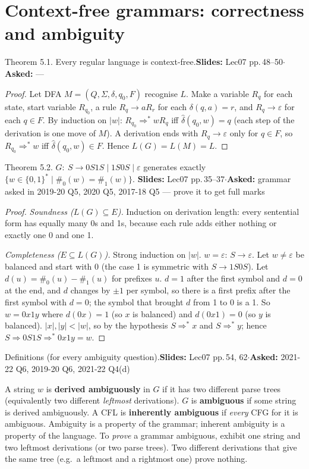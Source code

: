 \documentclass[10.5pt,a4paper]{article}
\newcommand{\src}[2]{{\footnotesize\color{gray!70!black}\textbf{Slides:} #1\enspace$\cdot$\enspace\textbf{Asked:} #2}\par}
\newcommand{\eps}{\varepsilon}
\newcommand{\dhat}{\hat{\delta}}
\begin{document}
\section{Context-free grammars: correctness and ambiguity}

\begin{thm}{Theorem 5.1. Every regular language is context-free.}\src{Lec07 pp.\,48--50}{---}\end{thm}
\begin{proof}
Let DFA $M=(Q,\Sigma,\delta,q_0,F)$ recognise $L$. Make a variable $R_q$ for each state, start variable $R_{q_0}$, a rule $R_q\to aR_r$ for each
$\delta(q,a)=r$, and $R_q\to\eps$ for each $q\in F$. By induction on $|w|$: $R_{q_0}\Rightarrow^*wR_q$ iff $\dhat(q_0,w)=q$ (each step
of the derivation is one move of $M$). A derivation ends with $R_q\to\eps$ only for $q\in F$, so $R_{q_0}\Rightarrow^*w$ iff
$\dhat(q_0,w)\in F$. Hence $L(G)=L(M)=L$.
\end{proof}

\begin{thm}{Theorem 5.2. $G:\ S\to0S1S\mid1S0S\mid\eps$ generates exactly $\{w\in\{0,1\}^*\mid \#_0(w)=\#_1(w)\}$.}
\src{Lec07 pp.\,35--37}{grammar asked in 2019-20 Q5, 2020 Q5, 2017-18 Q5 --- prove it to get full marks}\end{thm}
\begin{proof}
\emph{Soundness ($L(G)\subseteq E$).} Induction on derivation length: every sentential form has equally many 0s and 1s, because each rule
adds either nothing or exactly one 0 and one 1.

\emph{Completeness ($E\subseteq L(G)$).} Strong induction on $|w|$. $w=\eps$: $S\to\eps$. Let $w\ne\eps$ be balanced and start with 0 (the
case 1 is symmetric with $S\to1S0S$). Let $d(u)=\#_0(u)-\#_1(u)$ for prefixes $u$. $d=1$ after the first symbol and $d=0$ at the end, and
$d$ changes by $\pm1$ per symbol, so there is a first prefix after the first symbol with $d=0$; the symbol that brought $d$ from 1 to 0 is a 1.
So $w=0x1y$ where $d(0x)=1$ (so $x$ is balanced) and $d(0x1)=0$ (so $y$ is balanced). $|x|,|y|<|w|$, so by the hypothesis
$S\Rightarrow^*x$ and $S\Rightarrow^*y$; hence $S\Rightarrow0S1S\Rightarrow^*0x1y=w$.
\end{proof}

\begin{thm}{Definitions (for every ambiguity question).}\src{Lec07 pp.\,54, 62}{2021-22 Q6, 2019-20 Q6, 2021-22 Q4(d)}\end{thm}
A string $w$ is \textbf{derived ambiguously} in $G$ if it has two different parse trees (equivalently two different \emph{leftmost}
derivations). $G$ is \textbf{ambiguous} if some string is derived ambiguously. A CFL is \textbf{inherently ambiguous} if \emph{every} CFG for
it is ambiguous. Ambiguity is a property of the grammar; inherent ambiguity is a property of the language. To \emph{prove} a grammar
ambiguous, exhibit one string and two leftmost derivations (or two parse trees). Two different derivations that give the same tree (e.g.\ a
leftmost and a rightmost one) prove nothing.
\end{document}
